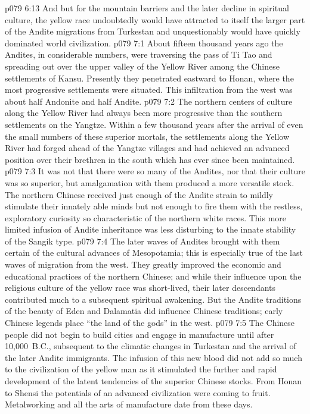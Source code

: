 \vs p079 6:13 And but for the mountain barriers and the later decline in spiritual culture, the yellow race undoubtedly would have attracted to itself the larger part of the Andite migrations from Turkestan and unquestionably would have quickly dominated world civilization.
\vs p079 7:1 About fifteen thousand years ago the Andites, in considerable numbers, were traversing the pass of Ti Tao and spreading out over the upper valley of the Yellow River among the Chinese settlements of Kansu. Presently they penetrated eastward to Honan, where the most progressive settlements were situated. This infiltration from the west was about half Andonite and half Andite.
\vs p079 7:2 The northern centers of culture along the Yellow River had always been more progressive than the southern settlements on the Yangtze. Within a few thousand years after the arrival of even the small numbers of these superior mortals, the settlements along the Yellow River had forged ahead of the Yangtze villages and had achieved an advanced position over their brethren in the south which has ever since been maintained.
\pc \vs p079 7:3 It was not that there were so many of the Andites, nor that their culture was so superior, but amalgamation with them produced a more versatile stock. The northern Chinese received just enough of the Andite strain to mildly stimulate their innately able minds but not enough to fire them with the restless, exploratory curiosity so characteristic of the northern white races. This more limited infusion of Andite inheritance was less disturbing to the innate stability of the Sangik type.
\pc \vs p079 7:4 The later waves of Andites brought with them certain of the cultural advances of Mesopotamia; this is especially true of the last waves of migration from the west. They greatly improved the economic and educational practices of the northern Chinese; and while their influence upon the religious culture of the yellow race was short\hyp{}lived, their later descendants contributed much to a subsequent spiritual awakening. But the Andite traditions of the beauty of Eden and Dalamatia did influence Chinese traditions; early Chinese legends place “the land of the gods” in the west.
\vs p079 7:5 The Chinese people did not begin to build cities and engage in manufacture until after 10,000~B.C., subsequent to the climatic changes in Turkestan and the arrival of the later Andite immigrants. The infusion of this new blood did not add so much to the civilization of the yellow man as it stimulated the further and rapid development of the latent tendencies of the superior Chinese stocks. From Honan to Shensi the potentials of an advanced civilization were coming to fruit. Metalworking and all the arts of manufacture date from these days.\plusone
